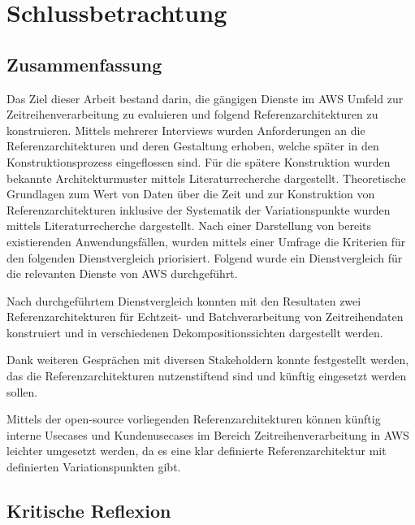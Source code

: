 \chapter{Schlussbetrachtung}
\section{Zusammenfassung}
Das Ziel dieser Arbeit bestand darin, die gängigen Dienste im \ac{AWS} Umfeld zur Zeitreihenverarbeitung zu evaluieren und folgend Referenzarchitekturen zu konstruieren. Mittels mehrerer Interviews wurden Anforderungen an die Referenzarchitekturen und deren Gestaltung erhoben, welche später in den Konstruktionsprozess eingeflossen sind. 
Für die spätere Konstruktion wurden bekannte Architekturmuster mittels Literaturrecherche dargestellt. Theoretische Grundlagen zum Wert von Daten über die Zeit und zur Konstruktion von Referenzarchitekturen inklusive der Systematik der Variationspunkte wurden mittels Literaturrecherche dargestellt. Nach einer Darstellung von bereits existierenden Anwendungsfällen, wurden mittels einer Umfrage die Kriterien für den folgenden Dienstvergleich priorisiert. Folgend wurde ein Dienstvergleich für die relevanten Dienste von \ac{AWS} durchgeführt.

Nach durchgeführtem Dienstvergleich konnten mit den Resultaten zwei Referenzarchitekturen für Echtzeit- und Batchverarbeitung von Zeitreihendaten konstruiert und in verschiedenen Dekompositionssichten dargestellt werden.

Dank weiteren Gesprächen mit diversen Stakeholdern konnte festgestellt werden, das die Referenzarchitekturen nutzenstiftend sind und künftig eingesetzt werden sollen.

Mittels der open-source vorliegenden Referenzarchitekturen können künftig interne Usecases und Kundenusecases im Bereich Zeitreihenverarbeitung in \ac{AWS} leichter umgesetzt werden, da es eine klar definierte Referenzarchitektur mit definierten Variationspunkten gibt.



\section{Kritische Reflexion}



